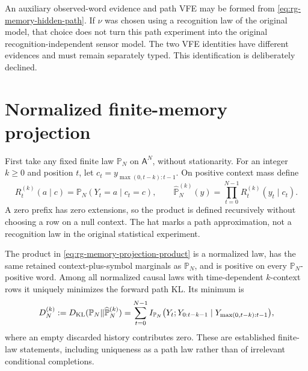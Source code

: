 An auxiliary observed-word evidence and path VFE may be formed from
\cref{eq:rg-memory-hidden-path}. If \(\nu\) was chosen using a
recognition law of the original model, that choice does not turn this path
experiment into the original recognition-independent sensor model. The two
VFE identities have different evidences and must remain separately typed.
This identification is deliberately declined. 

\section{Normalized finite-memory projection}
\label{sec:rg-memory-projection}

First take any fixed finite law \(\mathbb P_N\) on \(\mathsf A^N\),
without stationarity. For an integer \(k\geq0\) and position \(t\),
let \(c_t=y_{\max(0,t-k):t-1}\). On positive context mass define
\begin{equation}
 R_t^{(k)}(a\mid c)=\mathbb P_N(Y_t=a\mid c_t=c),\qquad
 \widehat{\mathbb P}_N^{(k)}(y)
    =\prod_{t=0}^{N-1}R_t^{(k)}(y_t\mid c_t).
\label{eq:rg-memory-projection-product}
\end{equation}
A zero prefix has zero extensions, so the product is defined recursively
without choosing a row on a null context. The hat marks a path approximation,
not a recognition law in the original statistical experiment.

The product in \cref{eq:rg-memory-projection-product} is a normalized
law, has the same retained context-plus-symbol marginals as
\(\mathbb P_N\), and is positive on every \(\mathbb P_N\)-positive
word. Among all normalized causal laws with time-dependent \(k\)-context
rows it uniquely minimizes the forward path KL. Its minimum is
\begin{equation}
 D_N^{(k)}:=D_{\mathrm{KL}}(\mathbb P_N\Vert\widehat{\mathbb P}_N^{(k)})
 =\sum_{t=0}^{N-1}
 I_{\mathbb P_N}\bigl(Y_t;Y_{0:t-k-1}\mid Y_{\max(0,t-k):t-1}\bigr),
\label{eq:rg-memory-information-defect}
\end{equation}
where an empty discarded history contributes zero. These are established
finite-law statements, including uniqueness as a path law rather than of
irrelevant conditional completions. 

